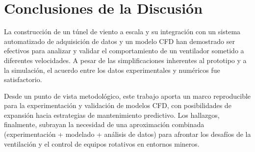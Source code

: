 \section{Conclusiones de la Discusión}
La construcción de un túnel de viento a escala y su integración con un sistema automatizado de adquisición de datos y un modelo CFD han demostrado ser efectivos para analizar y validar el comportamiento de un ventilador sometido a diferentes velocidades. A pesar de las simplificaciones inherentes al prototipo y a la simulación, el acuerdo entre los datos experimentales y numéricos fue satisfactorio. 

Desde un punto de vista metodológico, este trabajo aporta un marco reproducible para la experimentación y validación de modelos CFD, con posibilidades de expansión hacia estrategias de mantenimiento predictivo. Los hallazgos, finalmente, subrayan la necesidad de una aproximación combinada (experimentación + modelado + análisis de datos) para afrontar los desafíos de la ventilación y el control de equipos rotativos en entornos mineros.
